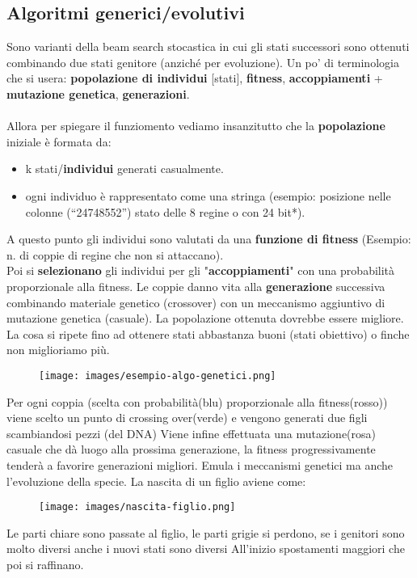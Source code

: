 \subsection{Algoritmi generici/evolutivi}
Sono varianti della beam search stocastica in cui gli stati successori sono ottenuti combinando due stati genitore (anziché per evoluzione).
Un po' di terminologia che si usera: \textbf{popolazione di individui} [stati], \textbf{fitness}, \textbf{accoppiamenti} + \textbf{mutazione genetica}, \textbf{generazioni}.\\\\
Allora per spiegare il funziomento vediamo insanzitutto che la \textbf{popolazione} iniziale è formata da:
\begin{itemize}
    \item k stati/\textbf{individui} generati casualmente.
    \item ogni individuo è rappresentato come una stringa (esempio: posizione nelle colonne (“24748552”) stato delle
    8 regine o con 24 bit*).
\end{itemize}
A questo punto gli individui sono valutati da una \textbf{funzione di fitness} (Esempio: n. di coppie di regine che non si attaccano).\\ 
Poi si \textbf{selezionano} gli individui per gli "\textbf{accoppiamenti}" con una probabilità proporzionale alla fitness.
Le coppie danno vita alla \textbf{generazione} successiva combinando materiale genetico (crossover) con un meccanismo aggiuntivo di mutazione genetica (casuale). 
La popolazione ottenuta dovrebbe essere migliore. La cosa si ripete fino ad ottenere stati abbastanza buoni (stati obiettivo) o finche non miglioriamo più.
\begin{example}
    \begin{figure}[h!]
        \centering
        \texttt{[image: images/esempio-algo-genetici.png]}
    \end{figure}

    Per ogni coppia (scelta con probabilità(blu) proporzionale alla fitness(rosso)) viene scelto un punto di crossing over(verde) e vengono generati due figli scambiandosi pezzi (del DNA)
    Viene infine effettuata una mutazione(rosa) casuale che dà luogo alla prossima generazione,
    la fitness progressivamente tenderà a favorire generazioni migliori. Emula i meccanismi genetici ma anche l’evoluzione della specie.
    La nascita di un figlio aviene come:\\
    \begin{figure}[h!]
        \centering
        \texttt{[image: images/nascita-figlio.png]}
    \end{figure}

    \hspace{-15pt}Le parti chiare sono passate al figlio, le parti grigie si perdono, se i genitori sono molto diversi anche i nuovi stati sono diversi
    All'inizio spostamenti maggiori che poi si raffinano.
\end{example}
